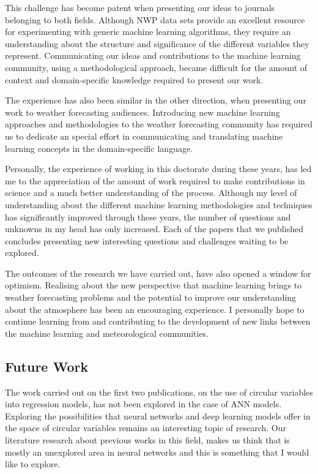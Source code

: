 \medskip

This challenge has become patent when presenting our ideas to journals belonging to both fields. Although NWP data sets provide an excellent resource for experimenting with generic machine learning algorithms, they require an understanding about the structure and significance of the different variables they represent. Communicating our ideas and contributions to the machine learning community, using a methodological approach, became difficult for the amount of context and domain-specific knowledge required to present our work.

\medskip

The experience has also been similar in the other direction, when presenting our work to weather forecasting audiences. Introducing new machine learning approaches and methodologies to the weather forecasting community has required us to dedicate an special effort in communicating and translating machine learning concepts in the domain-specific language. 

\medskip

Personally, the experience of working in this doctorate during these years, has led me to the appreciation of the amount of work required to make contributions in science and a much better understanding of the process. Although my level of understanding about the different machine learning methodologies and techniques has significantly improved through these years, the number of questions and unknowns in my head has only increased. Each of the papers that we published concludes presenting new interesting questions and challenges waiting to be explored.

\medskip

The outcomes of the research we have carried out, have also opened a window for optimism. Realising about the new perspective that machine learning brings to weather forecasting problems and the potential to improve our understanding about the atmosphere has been an encouraging experience. I personally hope to continue learning from and contributing to the development of new links between the machine learning and meteorological communities.

\subsection{Future Work}

The work carried out on the first two publications, on the use of circular variables into regression models, has not been explored in the case of ANN models. Exploring the possibilities that neural networks and deep learning models offer in the space of circular variables remains an interesting topic of research. Our literature research about previous works in this field, makes us think that is mostly an unexplored area in neural networks and this is something that I would like to explore.

